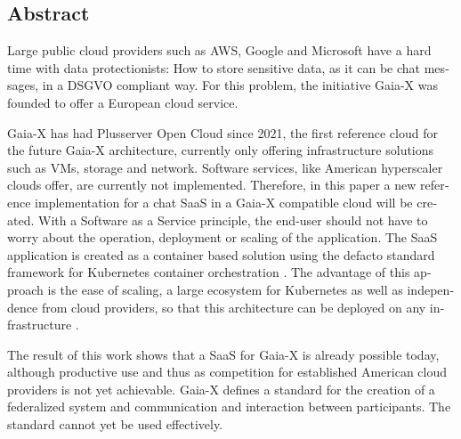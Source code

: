 

\begin{otherlanguage}{american}
	\chapter*{Abstract}
	Large public cloud providers such as AWS, Google and Microsoft have a hard time with data protectionists:
	How to store sensitive data, as it can be chat messages, in a DSGVO compliant way.
	For this problem, the initiative Gaia-X was founded to offer a European cloud service.

	Gaia-X has had Plusserver Open Cloud since 2021, the first reference cloud for the future Gaia-X architecture,
	currently only offering infrastructure solutions such as \acp{VM}, storage and network. 
	Software services, like American hyperscaler clouds offer, are currently not implemented.
	Therefore, in this paper a new reference implementation for a chat \ac{SaaS} in a Gaia-X compatible cloud will be created.
	With a Software as a Service principle, the end-user should not have to worry about the operation, deployment
	or scaling of the application. 
	The \ac{SaaS} application is created as a container based solution using the defacto standard framework for 
	Kubernetes container orchestration \cite{Burns2019}. The advantage of this approach is the ease of scaling,
	a large ecosystem for Kubernetes as well as independence from cloud providers, 
	so that this architecture can be deployed on any infrastructure \cite{Burns2019}.

	The result of this work shows that a \ac{SaaS} for Gaia-X is already possible today, 
	although productive use and thus as competition for established American cloud providers is not yet achievable. 
	Gaia-X defines a standard for the creation of a federalized system and communication and interaction between participants. 
	The standard cannot yet be used effectively. 

\end{otherlanguage}
